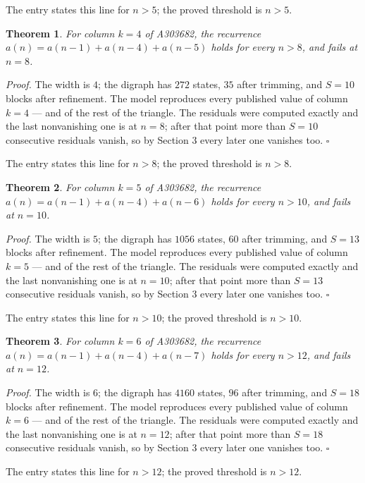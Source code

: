 \documentclass[11pt]{article}
\newtheorem{theorem}{Theorem}
\theoremstyle{definition}
\begin{document}
The entry states this line for $n > 5$; the proved threshold is $n > 5$.

\begin{theorem} For column $k = 4$ of A303682, the recurrence $a(n) = a(n-1) + a(n-4) + a(n-5)$ holds for every $n > 8$, and fails at $n = 8$.\end{theorem}

{\itshape Proof.} The width is $4$; the digraph has $272$ states, $35$ after trimming, and $S = 10$ blocks after refinement. The model reproduces every published value of column $k = 4$ --- and of the rest of the triangle. The residuals were computed exactly and the last nonvanishing one is at $n = 8$; after that point more than $S = 10$ consecutive residuals vanish, so by Section 3 every later one vanishes too. $\square$

The entry states this line for $n > 8$; the proved threshold is $n > 8$.

\begin{theorem} For column $k = 5$ of A303682, the recurrence $a(n) = a(n-1) + a(n-4) + a(n-6)$ holds for every $n > 10$, and fails at $n = 10$.\end{theorem}

{\itshape Proof.} The width is $5$; the digraph has $1056$ states, $60$ after trimming, and $S = 13$ blocks after refinement. The model reproduces every published value of column $k = 5$ --- and of the rest of the triangle. The residuals were computed exactly and the last nonvanishing one is at $n = 10$; after that point more than $S = 13$ consecutive residuals vanish, so by Section 3 every later one vanishes too. $\square$

The entry states this line for $n > 10$; the proved threshold is $n > 10$.

\begin{theorem} For column $k = 6$ of A303682, the recurrence $a(n) = a(n-1) + a(n-4) + a(n-7)$ holds for every $n > 12$, and fails at $n = 12$.\end{theorem}

{\itshape Proof.} The width is $6$; the digraph has $4160$ states, $96$ after trimming, and $S = 18$ blocks after refinement. The model reproduces every published value of column $k = 6$ --- and of the rest of the triangle. The residuals were computed exactly and the last nonvanishing one is at $n = 12$; after that point more than $S = 18$ consecutive residuals vanish, so by Section 3 every later one vanishes too. $\square$

The entry states this line for $n > 12$; the proved threshold is $n > 12$.
\end{document}
